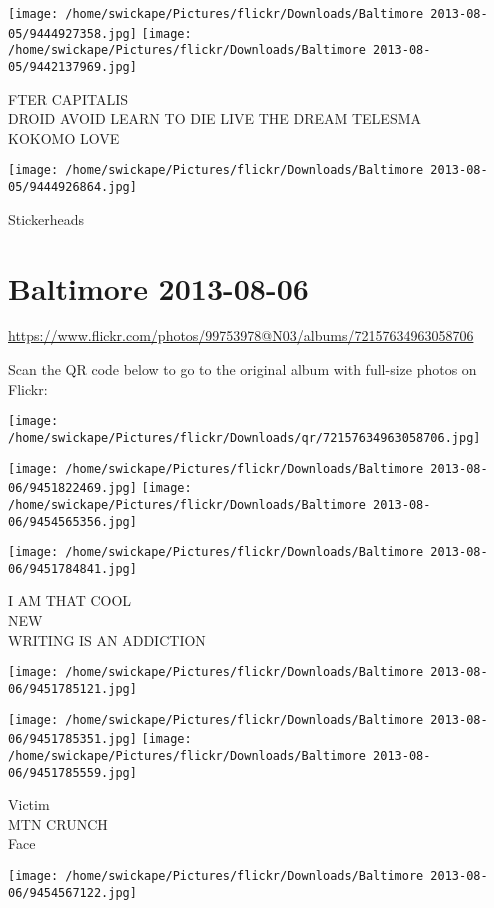 \documentclass[10pt,letterpaper]{article}
\begin{document}
\vspace{0.25in}
\texttt{[image: /home/swickape/Pictures/flickr/Downloads/Baltimore 2013-08-05/9444927358.jpg]}
\texttt{[image: /home/swickape/Pictures/flickr/Downloads/Baltimore 2013-08-05/9442137969.jpg]}

FTER CAPITALIS\\
DROID AVOID LEARN TO DIE LIVE THE DREAM TELESMA\\
KOKOMO LOVE
\pagebreak

\texttt{[image: /home/swickape/Pictures/flickr/Downloads/Baltimore 2013-08-05/9444926864.jpg]}

Stickerheads
\pagebreak

\section*{Baltimore 2013-08-06}

\url{https://www.flickr.com/photos/99753978@N03/albums/72157634963058706}

Scan the QR code below to go to the original album with full-size photos on Flickr:

\texttt{[image: /home/swickape/Pictures/flickr/Downloads/qr/72157634963058706.jpg]}
\pagebreak

\texttt{[image: /home/swickape/Pictures/flickr/Downloads/Baltimore 2013-08-06/9451822469.jpg]}
\texttt{[image: /home/swickape/Pictures/flickr/Downloads/Baltimore 2013-08-06/9454565356.jpg]}

\texttt{[image: /home/swickape/Pictures/flickr/Downloads/Baltimore 2013-08-06/9451784841.jpg]}

I AM THAT COOL\\
NEW\\
WRITING IS AN ADDICTION
\pagebreak

\texttt{[image: /home/swickape/Pictures/flickr/Downloads/Baltimore 2013-08-06/9451785121.jpg]}

\vspace{0.25in}
\texttt{[image: /home/swickape/Pictures/flickr/Downloads/Baltimore 2013-08-06/9451785351.jpg]}
\texttt{[image: /home/swickape/Pictures/flickr/Downloads/Baltimore 2013-08-06/9451785559.jpg]}

Victim\\
MTN CRUNCH\\
Face
\pagebreak

\texttt{[image: /home/swickape/Pictures/flickr/Downloads/Baltimore 2013-08-06/9454567122.jpg]}
\end{document}
